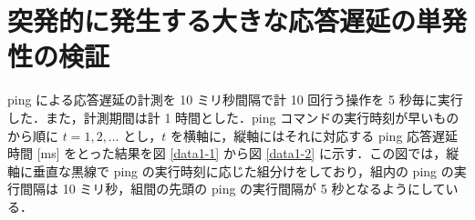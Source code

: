 \documentclass[a4j]{jarticle}
\begin{document}
\section{突発的に発生する大きな応答遅延の単発性の検証}
ping による応答遅延の計測を 10 ミリ秒間隔で計 10 回行う操作を 5 秒毎に実行した．また，計測期間は計 1 時間とした．ping コマンドの実行時刻が早いものから順に $t = 1,2,\ldots$ とし，$t$ を横軸に，縦軸にはそれに対応する ping 応答遅延時間 [ms] をとった結果を図 \ref{data1-1} から図 \ref{data1-2} に示す．この図では，縦軸に垂直な黒線で ping の実行時刻に応じた組分けをしており，組内の ping の実行間隔は 10 ミリ秒，組間の先頭の ping の実行間隔が 5 秒となるようにしている．
\begin{figure}[tb]
\begin{center}
~
~
\\


\end{center}
\end{figure}
\end{document}
